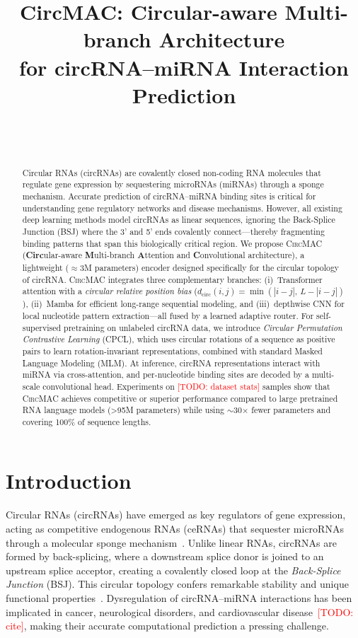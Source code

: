 \documentclass[10pt,twocolumn]{article}
\title{\textbf{CircMAC: Circular-aware Multi-branch Architecture\\
       for circRNA--miRNA Interaction Prediction}}
\author{
  \todo{Author 1} \quad \todo{Author 2} \\
  \todo{Affiliation} \\
  \texttt{\todo{email}}
}
\date{}
\newcommand{\todo}[1]{\textcolor{red}{[TODO: #1]}}
\newcommand{\circmac}{\textsc{CircMAC}}
\newcommand{\dcirc}{d_{\text{circ}}}
\begin{document}
\maketitle

\begin{abstract}
Circular RNAs (circRNAs) are covalently closed non-coding RNA molecules
that regulate gene expression by sequestering microRNAs (miRNAs) through
a sponge mechanism. Accurate prediction of circRNA--miRNA binding sites
is critical for understanding gene regulatory networks and disease
mechanisms. However, all existing deep learning methods model circRNAs as
linear sequences, ignoring the Back-Splice Junction (BSJ) where the 3'
and 5' ends covalently connect---thereby fragmenting binding patterns that
span this biologically critical region.
%
We propose \circmac{} (\textbf{Circ}ular-aware \textbf{M}ulti-branch
\textbf{A}ttention and \textbf{C}onvolutional architecture), a lightweight
($\approx$3M parameters) encoder designed specifically for the circular
topology of circRNA. \circmac{} integrates three complementary branches:
(i)~Transformer attention with a \emph{circular relative position bias}
($\dcirc(i,j)=\min(|i{-}j|,\,L{-}|i{-}j|)$),
(ii)~Mamba for efficient long-range sequential modeling, and
(iii)~depthwise CNN for local nucleotide pattern extraction---all fused
by a learned adaptive router.
%
For self-supervised pretraining on unlabeled circRNA data, we introduce
\emph{Circular Permutation Contrastive Learning} (CPCL), which uses
circular rotations of a sequence as positive pairs to learn
rotation-invariant representations, combined with standard
Masked Language Modeling (MLM).
At inference, circRNA representations interact with miRNA via
cross-attention, and per-nucleotide binding sites are decoded by a
multi-scale convolutional head.
%
Experiments on \todo{dataset stats} samples show that \circmac{}
achieves competitive or superior performance compared to large pretrained
RNA language models (\textgreater95M parameters) while using $\sim$30$\times$
fewer parameters and covering 100\% of sequence lengths.
\end{abstract}

\section{Introduction}
\label{sec:intro}

Circular RNAs (circRNAs) have emerged as key regulators of gene expression,
acting as competitive endogenous RNAs (ceRNAs) that sequester microRNAs
through a molecular sponge mechanism~\cite{hansen2013natural}.
Unlike linear RNAs, circRNAs are formed by back-splicing, where a
downstream splice donor is joined to an upstream splice acceptor,
creating a covalently closed loop at the \emph{Back-Splice Junction} (BSJ).
This circular topology confers remarkable stability and unique functional
properties~\cite{jeck2013circular}.
Dysregulation of circRNA--miRNA interactions has been implicated in cancer,
neurological disorders, and cardiovascular disease~\todo{cite},
making their accurate computational prediction a pressing challenge.
\end{document}
